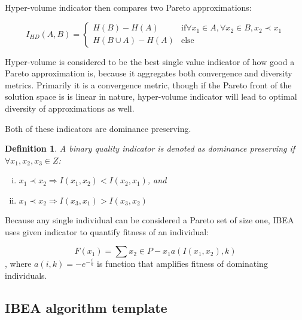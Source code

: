 \documentclass[12pt,oneside]{fithesis2}
\newtheorem{defn}{Definition}
\begin{document}
Hyper-volume indicator then compares two Pareto approximations:

$$I_{HD}(A,B) = 
\begin{cases} 
    H(B) - H(A) & \text{if} \forall x_1 \in A, \forall x_2 \in B, x_2 \prec x_1 \\
    H(B \cup A) - H(A) & \text{else}
\end{cases}$$

Hyper-volume is considered to be the best single value indicator of how good a Pareto approximation is, because it aggregates both convergence and diversity metrics. Primarily it is a convergence metric, though if the Pareto front of the solution space is is linear in nature, hyper-volume indicator will lead to optimal diversity of approximations as well. \cite{auger2009theory} 

Both of these indicators are dominance preserving. 

\begin{defn}
A binary quality indicator is denoted as dominance preserving if $\forall x_1,x_2,x_3 \in Z$:
\begin{enumerate}[(i)]
\item  $x_1 \prec x_2 \Rightarrow I({x_1},{x_2}) < I({x_2},{x_1})$, and
\item $x_1 \prec x_2 \Rightarrow I({x_3},{x_1}) > I({x_3},{x_2})$
\end{enumerate}
\end{defn}
Because any single individual can be considered a Pareto set of size one, IBEA uses given indicator to quantify fitness of an individual:

$$F(x_1) = \sum\limits{x_2 \in P - {x_1}} a(I(x_1,x_2),k)$$,
    where $a(i,k) = -e^{-\frac{i}{k}}$ is function that amplifies fitness of dominating individuals.

\subsection{IBEA algorithm template}
\end{document}
